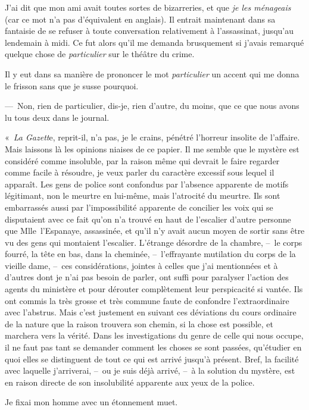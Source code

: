 \documentclass[french,twoside]{book} %
\begin{document}
J’ai dit que mon ami avait toutes sortes de bizarreries, et que \emph{je les ménageais} (car ce mot n’a pas d’équivalent en anglais). Il entrait maintenant dans sa fantaisie de se refuser à toute conversation relativement à l’assassinat, jusqu’au lendemain à midi. Ce fut alors qu’il me demanda brusquement si j’avais remarqué quelque chose de \emph{particulier} sur le théâtre du crime.\par
Il y eut dans sa manière de prononcer le mot \emph{particulier} un accent qui me donna le frisson sans que je susse pourquoi.\par
— Non, rien de particulier, dis-je, rien d’autre, du moins, que ce que nous avons lu tous deux dans le journal.\par
« \emph{La Gazett}e, reprit-il, n’a pas, je le crains, pénétré l’horreur insolite de l’affaire. Mais laissons là les opinions niaises de ce papier. Il me semble que le mystère est considéré comme insoluble, par la raison même qui devrait le faire regarder comme facile à résoudre, je veux parler du caractère excessif sous lequel il apparaît. Les gens de police sont confondus par l’absence apparente de motifs légitimant, non le meurtre en lui-même, mais l’atrocité du meurtre. Ils sont embarrassés aussi par l’impossibilité apparente de concilier les voix qui se disputaient avec ce fait qu’on n’a trouvé en haut de l’escalier d’autre personne que Mlle l’Espanaye, assassinée, et qu’il n’y avait aucun moyen de sortir sans être vu des gens qui montaient l’escalier. L’étrange désordre de la chambre, – le corps fourré, la tête en bas, dans la cheminée, – l’effrayante mutilation du corps de la vieille dame, – ces considérations, jointes à celles que j’ai mentionnées et à d’autres dont je n’ai pas besoin de parler, ont suffi pour paralyser l’action des agents du ministère et pour dérouter complètement leur perspicacité si vantée. Ils ont commis la très grosse et très commune faute de confondre l’extraordinaire avec l’abstrus. Mais c’est justement en suivant ces déviations du cours ordinaire de la nature que la raison trouvera son chemin, si la chose est possible, et marchera vers la vérité. Dans les investigations du genre de celle qui nous occupe, il ne faut pas tant se demander comment les choses se sont passées, qu’étudier en quoi elles se distinguent de tout ce qui est arrivé jusqu’à présent. Bref, la facilité avec laquelle j’arriverai, – ou je suis déjà arrivé, – à la solution du mystère, est en raison directe de son insolubilité apparente aux yeux de la police.\par
Je fixai mon homme avec un étonnement muet.\par
\end{document}

